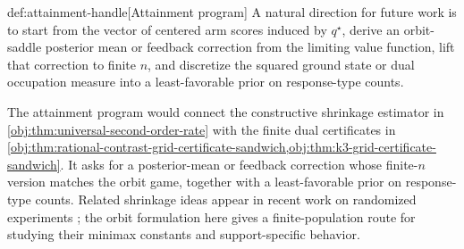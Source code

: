 \begin{remarkv}{def:attainment-handle}[Attainment program]
A natural direction for future work is to start from the vector of centered arm scores induced by \(q^\star\), derive an orbit-saddle posterior mean or feedback correction from the limiting value function, lift that correction to finite \(n\), and discretize the squared ground state or dual occupation measure into a least-favorable prior on response-type counts.
\end{remarkv}

The attainment program would connect the constructive shrinkage estimator in \cref{obj:thm:universal-second-order-rate} with the finite dual certificates in \cref{obj:thm:rational-contrast-grid-certificate-sandwich,obj:thm:k3-grid-certificate-sandwich}. It asks for a posterior-mean or feedback correction whose finite-\(n\) version matches the orbit game, together with a least-favorable prior on response-type counts. Related shrinkage ideas appear in recent work on randomized experiments \citep{rosenman_hunter_2026_shrinkage}; the orbit formulation here gives a finite-population route for studying their minimax constants and support-specific behavior.
